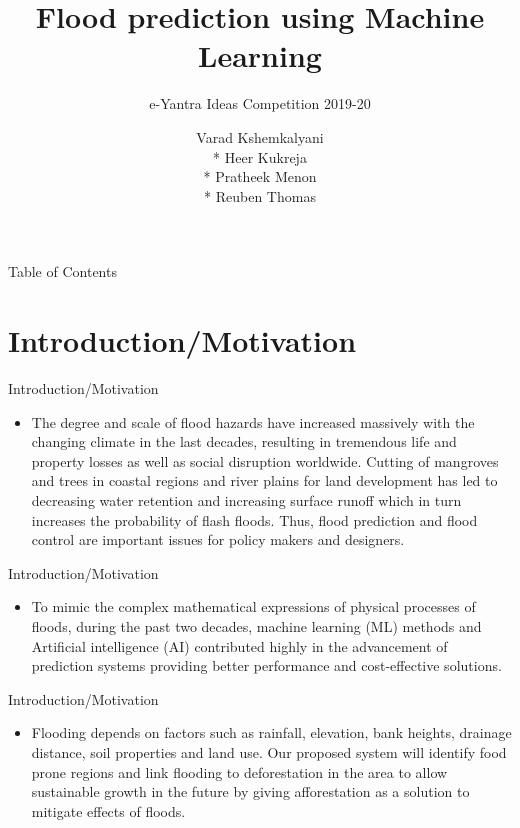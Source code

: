 \documentclass[10pt]{beamer}
\title[] %
{ %
      \textbf{Flood prediction using Machine Learning}
}
\subtitle{e-Yantra Ideas Competition 2019-20}
\author{Varad Kshemkalyani \\* Heer Kukreja \\* Pratheek Menon \\* Reuben Thomas}
\institute[]
{
    Vivekanand Institute Of Technology, Chembur\\
}
\begin{document}

{\1%
\begin{frame}[plain,noframenumbering] %
  \titlepage %
\end{frame}}


\begin{frame}{Table of Contents}{}
\tableofcontents
\end{frame}

\section{Introduction/Motivation}

\begin{frame}{Introduction/Motivation}

  \begin{itemize}
    \item The degree and scale of flood hazards have increased massively with the changing climate in the last decades, resulting in tremendous life and property losses as well as social disruption worldwide. Cutting of mangroves and trees in coastal regions and river plains for land development has led to decreasing water retention and increasing surface runoff which in turn increases the probability of flash floods. Thus, flood prediction and flood control are important issues for policy makers and designers.
    \end{itemize}
\end{frame}
\begin{frame}{Introduction/Motivation}
    \begin{itemize}
    \item To mimic the complex mathematical expressions of physical processes of floods, during the past two decades, machine learning (ML) methods and Artificial intelligence (AI) contributed highly in the advancement of prediction systems providing better performance and cost-effective solutions.
   \end{itemize}
\end{frame}
\begin{frame}{Introduction/Motivation}
\begin{itemize} 
 \item Flooding depends on factors such as rainfall, elevation, bank heights, drainage distance, soil properties and land use. Our proposed system will identify food prone regions and link flooding to deforestation in the area to allow sustainable growth in the future by giving afforestation as a solution to mitigate effects of floods.
  \end{itemize}
\end{frame}
\end{document}
